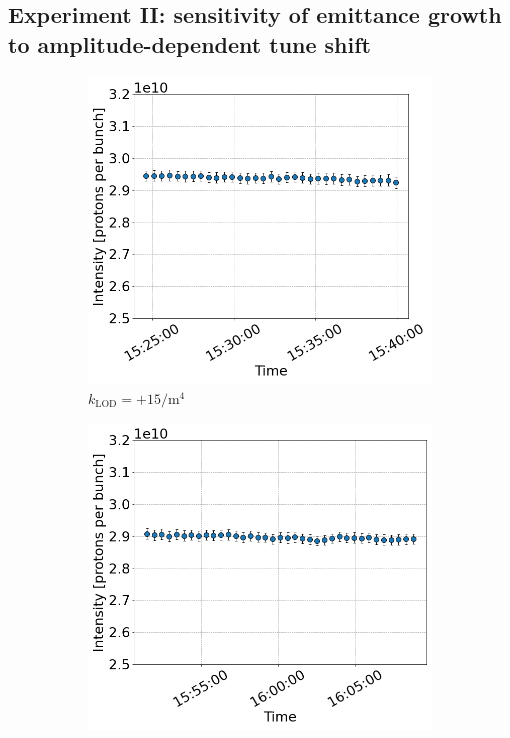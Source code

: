  \subsection{Experiment II: sensitivity of emittance growth to amplitude-dependent tune shift}\label{subsec:2022_exp2_intensity}


\begin{figure}[htp]
     \centering
     \begin{subfigure}{.45\textwidth}
         \centering
         \includegraphics[width=.95\linewidth]{images/app_e/intensity_cc_md_16May22_coast_6.png}  
         \caption{$k_\mathrm{LOD}=+15 \mathrm{/m^{4}}$}
     \end{subfigure}
     \begin{subfigure}{.45\textwidth}
         \centering
         \includegraphics[width=.95\linewidth]{images/app_e/intensity_cc_md_16May22_coast_7.png}  

\end{subfigure}
\end{figure}
